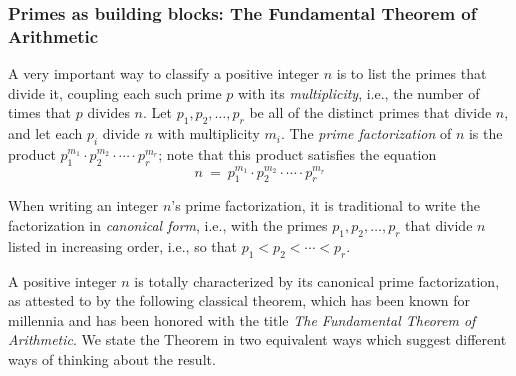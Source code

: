 \subsubsection{Primes as building blocks: The Fundamental Theorem of Arithmetic}
\label{sec:prime-factoriation}


A very important way to classify a positive integer $n$ is to list the
primes that divide it, coupling each such prime $p$ with its {\it
  multiplicity}, i.e., the number of times that $p$ divides $n$.  Let
$p_1, p_2, \ldots, p_r$ be all of the distinct primes that divide $n$,
and let each $p_i$ divide $n$ with multiplicity $m_i$.  The {\it prime
  factorization}
%
of $n$ is the product $p_1^{m_1} \cdot p_2^{m_2} \cdot \cdots \cdot
p_r^{m_r}$; note that this product satisfies the equation
\begin{equation}
\label{eq:prime-factorization}
n \ = \ p_1^{m_1} \cdot p_2^{m_2} \cdot \cdots \cdot p_r^{m_r}
\end{equation}

When writing an integer $n$'s prime factorization, it is traditional
to write the factorization in {\it canonical form},
i.e., with the primes $p_1, p_2, \ldots, p_r$ that divide $n$ listed
in increasing order, i.e., so that $p_1 < p_2 < \cdots < p_r$.

\noindent
A positive integer $n$ is totally characterized by its canonical prime
factorization, as attested to by the following classical theorem,
which has been known for millennia and has been honored with the title
{\em The Fundamental Theorem of Arithmetic}.
We state the Theorem in two equivalent ways which suggest different
ways of thinking about the result.

